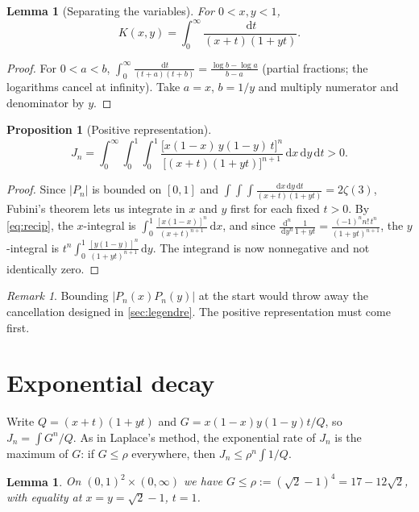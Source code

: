 \documentclass[11pt]{article}
\newcommand{\dd}{\,\mathrm{d}}
\theoremstyle{plain}
\newtheorem{lemma}[theorem]{Lemma}
\newtheorem{proposition}[theorem]{Proposition}
\theoremstyle{definition}
\theoremstyle{remark}
\newtheorem{remark}[theorem]{Remark}
\begin{document}
\begin{lemma}[Separating the variables]\label{lem:sep}
For $0<x,y<1$,
\[
  K(x,y)=\int_0^\infty\frac{\dd t}{(x+t)(1+yt)} .
\]
\end{lemma}

\begin{proof}
For $0<a<b$, $\int_0^\infty\frac{\dd t}{(t+a)(t+b)}=\frac{\log b-\log a}{b-a}$ (partial fractions;
the logarithms cancel at infinity). Take $a=x$, $b=1/y$ and multiply numerator and denominator
by $y$.
\end{proof}

\begin{proposition}[Positive representation]\label{prop:pos}
\[
  J_n=\int_0^\infty\!\!\int_0^1\!\!\int_0^1
  \frac{\bigl[x(1-x)\,y(1-y)\,t\bigr]^n}{\bigl[(x+t)(1+yt)\bigr]^{n+1}}\dd x\dd y\dd t>0 .
\]
\end{proposition}

\begin{proof}
Since $|P_n|$ is bounded on $[0,1]$ and $\int\!\!\int\!\!\int\frac{\dd x\dd y\dd t}{(x+t)(1+yt)}=2\zeta(3)$,
Fubini's theorem lets us integrate in $x$ and $y$ first for each fixed $t>0$. By
\eqref{eq:recip}, the $x$-integral is $\int_0^1\frac{[x(1-x)]^n}{(x+t)^{n+1}}\dd x$, and since
$\frac{\dd^n}{\dd y^n}\frac1{1+yt}=\frac{(-1)^nn!\,t^n}{(1+yt)^{n+1}}$, the $y$-integral is
$t^n\int_0^1\frac{[y(1-y)]^n}{(1+yt)^{n+1}}\dd y$. The integrand is now nonnegative and not
identically zero.
\end{proof}

\begin{remark}
Bounding $|P_n(x)P_n(y)|$ at the start would throw away the cancellation designed in
\cref{sec:legendre}. The positive representation must come first.
\end{remark}

\section{Exponential decay}\label{sec:decay}

Write $Q=(x+t)(1+yt)$ and $G=x(1-x)y(1-y)t/Q$, so $J_n=\int G^n/Q$. As in Laplace's method, the
exponential rate of $J_n$ is the maximum of $G$: if $G\le\rho$ everywhere, then $J_n\le\rho^n\int1/Q$.

\begin{lemma}\label{lem:max}
On $(0,1)^2\times(0,\infty)$ we have $G\le\rho:=(\sqrt2-1)^4=17-12\sqrt2$, with equality at
$x=y=\sqrt2-1$, $t=1$.
\end{lemma}
\end{document}

